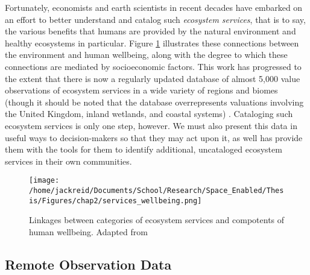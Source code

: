 \documentclass[notitlepage]{article}
\begin{document}
Fortunately, economists and earth scientists in recent decades have embarked on an effort to better understand and catalog such \textit{ecosystem services}, that is to say, the various benefits that humans are provided by the natural environment and healthy ecosystems in particular. Figure \ref{fig:services_wellbeing} illustrates these connections between the environment and human wellbeing, along with the degree to which these connections are mediated by socioeconomic factors. This work has progressed to the extent that there is now a regularly updated database of almost 5,000 value observations of ecosystem services in a wide variety of regions and biomes (though it should be noted that the database overrepresents valuations involving the United Kingdom, inland wetlands, and coastal systems) \cite{grootEcosystemServicesValuation2020}. Cataloging such ecosystem services is only one step, however. We must also present this data in useful ways to decision-makers  so that they may act upon it, as well has provide them with the tools for them to identify additional, uncataloged ecosystem services in their own communities.

\begin{figure}[h]
	\centering
	\texttt{[image: /home/jackreid/Documents/School/Research/Space\_Enabled/Thesis/Figures/chap2/services\_wellbeing.png]}
	\caption[Linkages between categories of ecosystem services and compotents of human wellbeing]{Linkages between categories of ecosystem services and compotents of human wellbeing. Adapted from \cite{reidEcosystemsHumanWellbeing2005}}
	\label{fig:services_wellbeing}
\end{figure}

\subsection{Remote Observation Data} \label{sec:remote}
\end{document}
